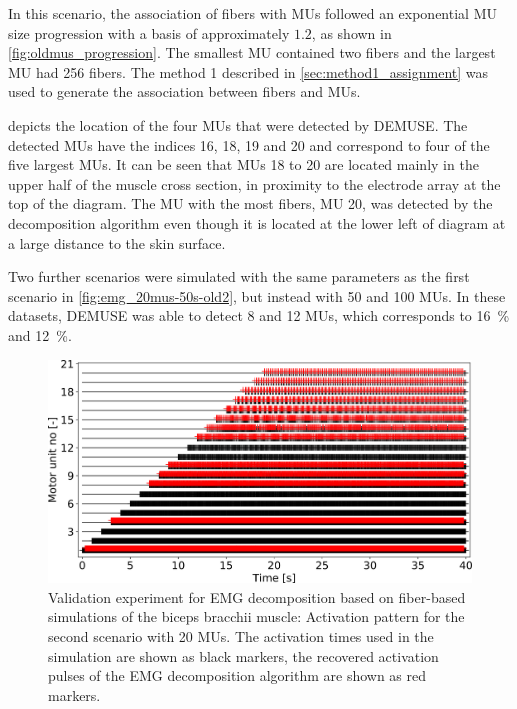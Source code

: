 In this scenario, the association of fibers with MUs followed an exponential MU size progression with a basis of approximately $1.2$, as shown in \cref{fig:oldmus_progression}. The smallest MU contained two fibers and the largest MU had 256 fibers. The method 1 described in \cref{sec:method1_assignment} was used to generate the association between fibers and MUs.

 depicts the location of the four MUs that were detected by DEMUSE. The detected MUs have the indices 16, 18, 19 and 20 and correspond to four of the five largest MUs. It can be seen that MUs 18 to 20 are located mainly in the upper half of the muscle cross section, in proximity to the electrode array at the top of the diagram.
The MU with the most fibers, MU 20, was detected by the decomposition algorithm even though it is located at the lower left of diagram at a large distance to the skin surface.

Two further scenarios were simulated with the same parameters as the first scenario in \cref{fig:emg_20mus-50s-old2}, but instead with 50 and 100 MUs. In these datasets, DEMUSE was able to detect 8 and 12 MUs, which corresponds to \SI{16}{\percent} and \SI{12}{\percent}. 

\begin{figure}
  \centering%
  \includegraphics[width=\textwidth]{images/results/application/emg_20mus-40s_new3.png}%
  \caption{Validation experiment for EMG decomposition based on fiber-based simulations of the biceps bracchii muscle: Activation pattern for the second scenario with 20 MUs. The activation times used in the simulation are shown as black markers, the recovered activation pulses of the EMG decomposition algorithm are shown as red markers.}%
  \label{fig:emg_20mus-40s_new}%
\end{figure}

